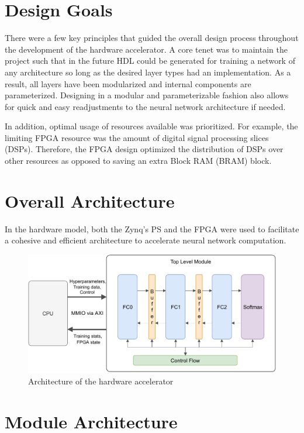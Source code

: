 \section{Design Goals}
There were a few key principles that guided the overall design process throughout the development of the hardware accelerator. A core tenet was to maintain the project such that in the future HDL could be generated for training a network of any architecture so long as the desired layer types had an implementation. As a result, all layers have been modularized and internal components are parameterized. Designing in a modular and parameterizable fashion also allows for quick and easy readjustments to the neural network architecture if needed.
\par 
In addition, optimal usage of resources available was prioritized. For example, the limiting FPGA resource was the amount of digital signal processing slices (DSPs). Therefore, the FPGA design optimized the distribution of DSPs over other resources as opposed to saving an extra Block RAM (BRAM) block. 

\section{Overall Architecture}
In the hardware model, both the Zynq's PS and the FPGA were used to facilitate a cohesive and efficient architecture to accelerate neural network computation.  

\begin{figure}
	\centering 
	\includegraphics[width=\textwidth]{figures/overall_arch}
	\caption{Architecture of the hardware accelerator}\label{overall-arch}
\end{figure}

\section{Module Architecture}

